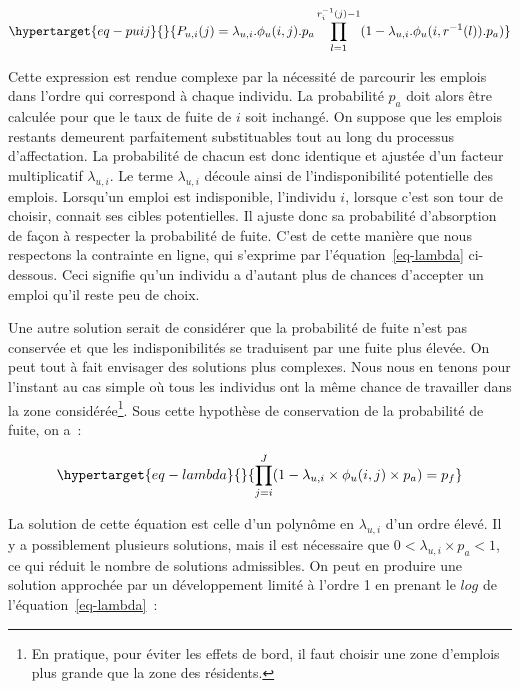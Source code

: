 \documentclass[
  10pt,
  a4paper,
  numbers=noendperiod,
  DIV=9]{scrartcl}
\begin{document}
\begin{equation}\protect\hypertarget{eq-puij}{}{
P_{u, i}(j) = \lambda_{u,i}.\phi_u(i,j). p_a \prod_{l=1}^{r_i^{-1}(j)-1}(1-\lambda_{u,i}. \phi_u(i,r^{-1}(l)).p_a)
}\label{eq-puij}\end{equation}

Cette expression est rendue complexe par la nécessité de parcourir les
emplois dans l'ordre qui correspond à chaque individu. La probabilité
\(p_a\) doit alors être calculée pour que le taux de fuite de \(i\) soit
inchangé. On suppose que les emplois restants demeurent parfaitement
substituables tout au long du processus d'affectation. La probabilité de
chacun est donc identique et ajustée d'un facteur multiplicatif
\(\lambda_{u,i}\). Le terme \(\lambda_{u,i}\) découle ainsi de
l'indisponibilité potentielle des emplois. Lorsqu'un emploi est
indisponible, l'individu \(i\), lorsque c'est son tour de choisir,
connait ses cibles potentielles. Il ajuste donc sa probabilité
d'absorption de façon à respecter la probabilité de fuite. C'est de
cette manière que nous respectons la contrainte en ligne, qui s'exprime
par l'équation~\ref{eq-lambda} ci-dessous. Ceci signifie qu'un individu
a d'autant plus de chances d'accepter un emploi qu'il reste peu de
choix.

Une autre solution serait de considérer que la probabilité de fuite
n'est pas conservée et que les indisponibilités se traduisent par une
fuite plus élevée. On peut tout à fait envisager des solutions plus
complexes. Nous nous en tenons pour l'instant au cas simple où tous les
individus ont la même chance de travailler dans la zone
considérée\footnote{En pratique, pour éviter les effets de bord, il faut
  choisir une zone d'emplois plus grande que la zone des résidents.}.
Sous cette hypothèse de conservation de la probabilité de fuite, on a~:

\begin{equation}\protect\hypertarget{eq-lambda}{}{
\prod_{j=i} ^{J} (1-\lambda_{u,i} \times \phi_u(i,j) \times p_{a})= p_f
}\label{eq-lambda}\end{equation}

La solution de cette équation est celle d'un polynôme en
\(\lambda_{u,i}\) d'un ordre élevé. Il y a possiblement plusieurs
solutions, mais il est nécessaire que \(0<\lambda_{u,i}\times p_a<1\),
ce qui réduit le nombre de solutions admissibles. On peut en produire
une solution approchée par un développement limité à l'ordre 1 en
prenant le \(log\) de l'équation~\ref{eq-lambda}~:
\end{document}
